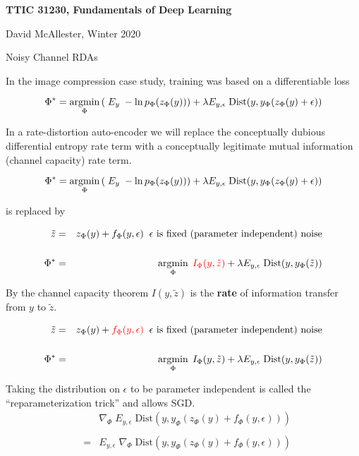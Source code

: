 





{\Huge

  \centerline{\bf TTIC 31230, Fundamentals of Deep Learning}
  \bigskip
  \centerline{David McAllester, Winter 2020}
  \vfill
  \centerline{Noisy Channel RDAs}
  \vfill
  \vfill


In the image compression case study, training was based on a differentiable loss

\vfill
$$\Phi^* = \operatorname*{argmin}_\Phi \left(\; E_y\;- \ln p_\Phi(z_\Phi(y))\right) + \lambda E_{y,\epsilon}\; \mathrm{Dist}(y,y_\Phi(z_\Phi(y) + \epsilon))$$

\vfill
In a rate-distortion auto-encoder we will replace the conceptually dubious differential entropy rate term with a conceptually legitimate
mutual information (channel capacity) rate term.


$$\Phi^* = \operatorname*{argmin}_\Phi \left(\; E_y\;- \ln p_\Phi(z_\Phi(y))\right) + \lambda E_{y,\epsilon}\; \mathrm{Dist}(y,y_\Phi(z_\Phi(y) + \epsilon))$$

\vfill
is replaced by

\begin{eqnarray*}
\tilde{z} & = & z_\Phi(y) + f_\Phi(y,\epsilon) \;\;\mbox{$\epsilon$ is fixed (parameter independent) noise} \\
\\
\Phi^* & = & \operatorname*{argmin}_\Phi \;{\color{red} I_\Phi(y,\tilde{z})} + \lambda E_{y,\epsilon}\; \mathrm{Dist}(y,y_\Phi(\tilde{z}))
\end{eqnarray*}

\vfill
By the channel capacity theorem {\color{red} $I(y,\tilde{z})$} is the {\bf rate} of information transfer from $y$ to $\tilde{z}$.


\bigskip
\bigskip
\begin{eqnarray*}
\tilde{z} & = & z_\Phi(y) + {\color{red} f_\Phi(y,\epsilon)} \;\;\mbox{$\epsilon$ is fixed (parameter independent) noise} \\
\\
\Phi^* & = & \operatorname*{argmin}_\Phi \;I_\Phi(y,\tilde{z}) + \lambda E_{y,\epsilon}\; \mathrm{Dist}(y,y_\Phi(\tilde{z}))
\end{eqnarray*}

\vfill
Taking the distribution on $\epsilon$ to be parameter independent is called the ``reparameterization trick'' and allows SGD.
\begin{eqnarray*}
& & \nabla_\Phi \;E_{y,\epsilon}\; \mathrm{Dist}(y,y_\Phi(z_\Phi(y) + f_\Phi(y,\epsilon))) \\
\\
& = & E_{y,\epsilon}\; \nabla_\Phi\;\mathrm{Dist}(y,y_\Phi(z_\Phi(y) + f_\Phi(y,\epsilon)))
\end{eqnarray*}

}
